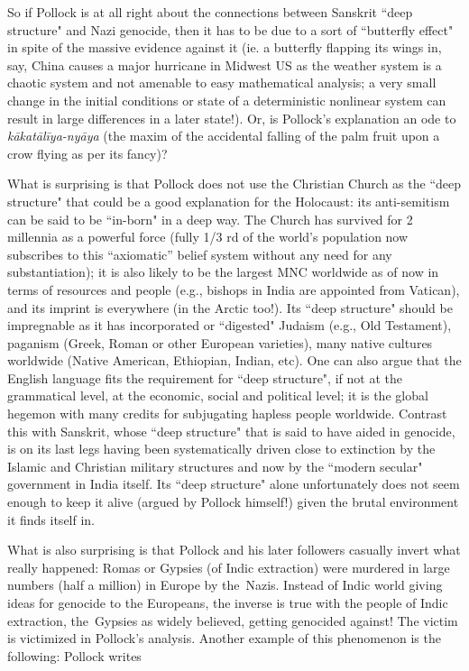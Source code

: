 So if Pollock is at all right about the connections between Sanskrit ``deep structure" and Nazi genocide, then it has to be due to a sort of ``butterfly effect" in spite of the massive evidence against it (ie. a butterfly flapping its wings in, say, China causes a major hurricane in Midwest US as the weather system is a chaotic system and not amenable to easy mathematical analysis; a very small change in the initial conditions or state of a deterministic nonlinear system can result in large differences in a later state!). Or, is Pollock's explanation an ode to {\sl kākatālīya-nyāya} (the maxim of the accidental falling of the palm fruit upon a crow flying as per its fancy)?

What is surprising is that Pollock does not use the Christian Church as the ``deep structure" that could be a good explanation for the Holocaust: its anti-semitism can be said to be ``in-born" in a deep way. The Church has survived for 2 millennia as a powerful force (fully 1/3 rd of the world's population now subscribes to this “axiomatic” belief system without any need for any substantiation); it is also likely to be the largest MNC worldwide as of now in terms of resources and people (e.g., bishops in India are appointed from Vatican), and its imprint is everywhere (in the Arctic too!). Its ``deep structure" should be impregnable as it has incorporated or ``digested" Judaism (e.g., Old Testament), paganism (Greek, Roman or other European varieties), many native cultures worldwide (Native American, Ethiopian, Indian, etc). One can also argue that the English language fits the requirement for ``deep structure", if not at the grammatical level, at the economic, social and political level; it is the global hegemon with many credits for subjugating hapless people worldwide. Contrast this with Sanskrit, whose “deep structure" that is said to have aided in genocide, is on its last legs having been systematically driven close to extinction by the Islamic and Christian military structures and now by the ``modern secular" government in India itself. Its ``deep structure" alone unfortunately does not seem enough to keep it alive (argued by Pollock himself!) given the brutal environment it finds itself in.

What is also surprising is that Pollock and his later followers casually invert what really happened: Romas or Gypsies (of Indic extraction) were murdered in large numbers (half a million) in Europe by the~Nazis. Instead of Indic world giving ideas for genocide to the Europeans, the inverse is true with the people of Indic extraction, the~Gypsies as widely believed, getting genocided against! The victim is victimized in Pollock's analysis. Another example of this phenomenon is the following: Pollock writes

